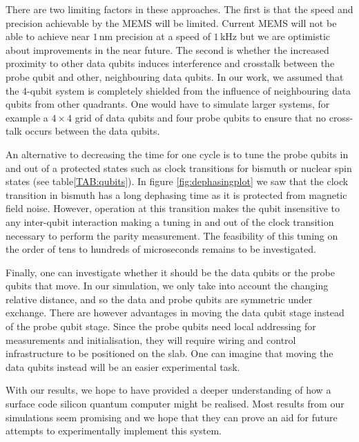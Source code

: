 There are two limiting factors in these approaches. The first is that the speed and precision achievable by the MEMS will be limited. Current MEMS will not be able to achieve near $1\, $nm precision at a speed of $1\, $kHz \cite{Koo2012,Chu2003} but we are optimistic about improvements in the near future. The second is whether the increased proximity to other data qubits induces interference and crosstalk between the probe qubit and other, neighbouring data qubits. In our work, we assumed that the 4-qubit system is completely shielded from the influence of neighbouring data qubits from other quadrants. One would have to simulate larger systems, for example a $4\times 4$ grid of data qubits and four probe qubits to ensure that no cross-talk occurs between the data qubits. 

An alternative to decreasing the time for one cycle is to tune the probe qubits in and out of a protected states such as clock transitions for bismuth or nuclear spin states (see table\@ \ref{TAB:qubits}). In figure \ref{fig:dephasingplot} we saw that the clock transition in bismuth has a long dephasing time as it is protected from magnetic field noise. However, operation at this transition makes the qubit insensitive to any inter-qubit interaction making a tuning in and out of the clock transition necessary to perform the parity measurement. The feasibility of this tuning on the order of tens to hundreds of microseconds remains to be investigated.

Finally, one can investigate whether it should be the data qubits or the probe qubits that  move. In our simulation, we only take into account the changing relative distance, and so the data and probe qubits are symmetric under exchange. There are however advantages in moving the data qubit stage instead of the probe qubit stage. Since the probe qubits need local addressing for measurements and initialisation, they will require wiring and control infrastructure to be positioned on the slab. One can imagine that moving the data qubits instead will be an easier experimental task. 

With our results, we hope to have provided a deeper understanding of how a surface code silicon quantum computer might be realised. Most results from our simulations seem promising and we hope that they can prove an aid for future attempts to experimentally implement this system. 













